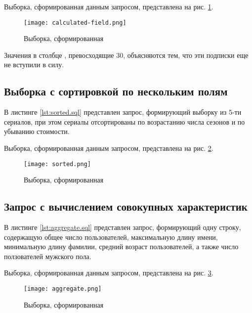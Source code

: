 

Выборка, сформированная данным запросом, представлена на рис. \ref{fig:calculated-field}.

\begin{figure}[H]
	\centering
	\texttt{[image: calculated-field.png]}
	\caption{Выборка, сформированная }
	\label{fig:calculated-field}
\end{figure}

Значения в столбце , превосходящие 30, объясняются тем, что эти подписки еще не вступили в силу.

\subsection{Выборка с сортировкой по нескольким полям}

В листинге \ref{lst:sorted.sql} представлен запрос, формирующий выборку из 5-ти сериалов, при этом сериалы отсортированы по возрастанию числа сезонов и по убыванию стоимости.



Выборка, сформированная данным запросом, представлена на рис. \ref{fig:sorted}.

\begin{figure}[H]
	\centering
	\texttt{[image: sorted.png]}
	\caption{Выборка, сформированная }
	\label{fig:sorted}
\end{figure}

\subsection{Запрос с вычислением совокупных характеристик}

В листинге \ref{lst:aggregate.sql} представлен запрос, формирующий одну строку, содержащую общее число пользователей, максимальную длину имени, минимальную длину фамилии, средний возраст пользователей, а также число ползователей мужского пола.



Выборка, сформированная данным запросом, представлена на рис. \ref{fig:aggregate}.

\begin{figure}[H]
	\centering
	\texttt{[image: aggregate.png]}
	\caption{Выборка, сформированная }
	\label{fig:aggregate}
\end{figure}

